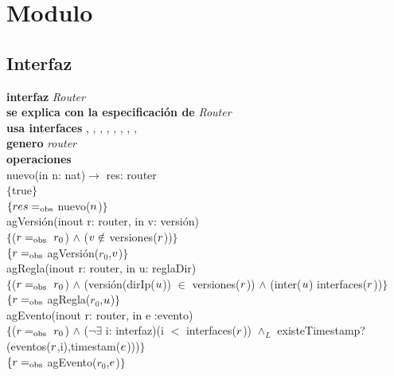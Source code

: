 \section*{Modulo }

\subsection*{Interfaz}
\textbf{interfaz} \textit{Router}\\
\textbf{se explica con la especificaci\'on de} \textit{Router}\\
\textbf{usa interfaces} , , , , , , , , \\
\textbf{genero} \textit{router}\\
\textbf{operaciones}\\

nuevo(in n: nat)$\rightarrow$ res: router\\
$\{$true$\}$\\
$\{{res} =_{\mathrm{obs}}$ nuevo(${n}$)$\}$\\

agVersi\'on(inout r: router, in v: versi\'on)\\
$\{$(${r} =_{\mathrm{obs}}\ r_0$) $\wedge$ (${v} \notin$ versiones(${r}$))$\}$\\
$\{{r} =_{\mathrm{obs}}$ agVersi\'on($r_0$,${v}$)$\}$\\

agRegla(inout r: router, in u: reglaDir)\\
$\{$(${r} =_{\mathrm{obs}}\ r_0$) $\wedge$ (versi\'on(dirIp(${u}$)) $\in$ versiones(${r}$)) $\wedge$ (inter(${u}$) interfaces(${r}$))$\}$\\
$\{{r} =_{\mathrm{obs}}$ agRegla($r_0$,${u}$)$\}$\\

agEvento(inout r: router, in e :evento)\\
$\{$(${r} =_{\mathrm{obs}}\ r_0$) $\wedge$ ($\neg \exists$ i: interfaz)(i $<$ interfaces(${r}$)) $\wedge_L$ existeTimestamp?(eventos(${r}$,i),timestam(${e}$)))$\}$\\
$\{{r}=_{\mathrm{obs}}$ agEvento($r_0$,${e}$)$\}$\\

